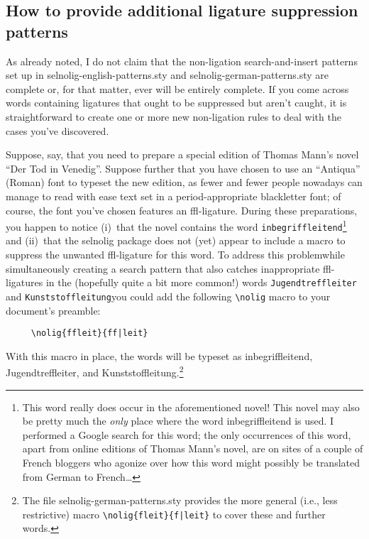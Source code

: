 \documentclass[11pt]{article}
\newcommand{\pkg}[1]{\textsf{#1}}
\newcommand{\opt}[1]{\texttt{#1}}
\begin{document}
\subsection{How to provide additional ligature suppression patterns}

As already noted, I do not claim that the non-ligation search-and-insert patterns set up in \pkg{selnolig-english-patterns.sty} and \pkg{selnolig-german-patterns.sty} are complete or, for that matter, ever will be entirely complete. If you come across words containing ligatures that ought to be suppressed but aren't caught, it is straightforward to create one or more new non-ligation rules to deal with the cases you've discovered.

Suppose, say, that you need to prepare a special edition of Thomas Mann's novel \enquote{Der Tod in Venedig}. Suppose further that you have chosen to use an \enquote{Antiqua} (Roman) font to typeset the new edition, as fewer and fewer people nowadays can manage to read with ease text set in a {\blackletterfont period-appropriate blackletter font}; of course, the font you've chosen features an ffl-ligature. During these preparations, you happen to notice (i)~that the novel contains the word \opt{inbegriffleitend}\footnote{This word really does occur in the aforementioned novel! This novel may also be pretty much the \emph{only} place where the word inbegriffleitend is used. I performed a Google search for this word; the only occurrences of this word, apart from online editions of Thomas Mann's novel, are on sites of a couple of French bloggers who agonize over how this word might possibly be translated from German to French\dots} and (ii)~that the \pkg{selnolig} package does not (yet) appear to include a macro to suppress the unwanted ffl-ligature for this word. To address this problem\textemdash while simultaneously creating a search pattern that also catches inappropriate ffl-ligatures in the (hopefully quite a bit more common!) words \opt{Jugendtreffleiter} and \opt{Kunststoffleitung}\textemdash you could add the following \Verb+\nolig+ macro to your document's preamble:
\begin{Verbatim}
     \nolig{ffleit}{ff|leit}
\end{Verbatim}
With this macro in place, the words will be typeset as inbegriffleitend, Jugendtreffleiter, and Kunststoffleitung.\footnote{The file \pkg{selnolig-german-patterns.sty} provides the more general (i.e., less restrictive) macro \Verb+\nolig{fleit}{f|leit}+ to cover these and further words.} 
\end{document}
